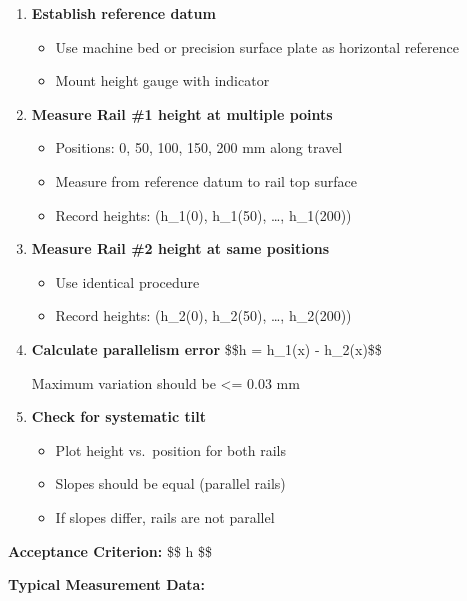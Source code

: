 \documentclass[
]{article}
\providecommand{\tightlist}{%
  \setlength{\itemsep}{0pt}\setlength{\parskip}{0pt}}
\begin{document}
\begin{enumerate}
\def\labelenumi{\arabic{enumi}.}
\item
  \textbf{Establish reference datum}

  \begin{itemize}
  \tightlist
  \item
    Use machine bed or precision surface plate as horizontal reference
  \item
    Mount height gauge with indicator
  \end{itemize}
\item
  \textbf{Measure Rail \#1 height at multiple points}

  \begin{itemize}
  \tightlist
  \item
    Positions: 0, 50, 100, 150, 200 mm along travel
  \item
    Measure from reference datum to rail top surface
  \item
    Record heights: (h\_1(0), h\_1(50), \ldots, h\_1(200))
  \end{itemize}
\item
  \textbf{Measure Rail \#2 height at same positions}

  \begin{itemize}
  \tightlist
  \item
    Use identical procedure
  \item
    Record heights: (h\_2(0), h\_2(50), \ldots, h\_2(200))
  \end{itemize}
\item
  \textbf{Calculate parallelism error} \$\$\Delta h = \textbar h\_1(x) -
  h\_2(x)\textbar\$\$

  Maximum variation should be \textless= 0.03 mm
\item
  \textbf{Check for systematic tilt}

  \begin{itemize}
  \tightlist
  \item
    Plot height vs.~position for both rails
  \item
    Slopes should be equal (parallel rails)
  \item
    If slopes differ, rails are not parallel
  \end{itemize}
\end{enumerate}

\textbf{Acceptance Criterion:} \$\$
\textbar{}\Delta h\textbar{}  \$\$

\textbf{Typical Measurement Data:}
\end{document}
